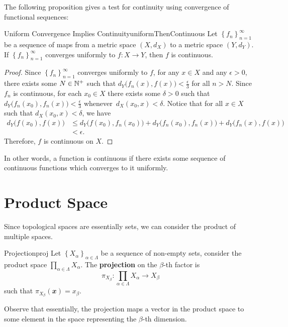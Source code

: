 \documentclass[math]{amznotes}
\theoremstyle{remark}
\begin{document}
The following proposition gives a test for continuity using convergence of functional sequences:
\begin{probox}{Uniform Convergence Implies Continuity}{uniformThenContinuous}
    Let $\left\{f_n\right\}_{n = 1}^{\infty}$ be a sequence of maps from a metric space $\left(X, d_X\right)$ to a metric space $\left(Y, d_Y\right)$. If $\left\{f_n\right\}_{n = 1}^{\infty}$ converges uniformly to $f \colon X \to Y$, then $f$ is continuous.
    \tcblower
    \begin{proof}
        Since $\left\{f_n\right\}_{n = 1}^{\infty}$ converges uniformly to $f$, for any $x \in X$ and any $\epsilon > 0$, there exists some $N \in \mathbb{N}^+$ such that $d_Y\bigl(f_n\left(x\right), f\left(x\right)\bigr) < \frac{\epsilon}{3}$ for all $n > N$. Since $f_n$ is continuous, for each $x_0 \in X$ there exists some $\delta > 0$ such that $d_Y\bigl(f_n\left(x_0\right), f_n\left(x\right)\bigr) < \frac{\epsilon}{3}$ whenever~$d_X\left(x_0, x\right) < \delta$. Notice that for all $x \in X$ such that $d_X\left(x_0, x\right) < \delta$, we have 
        \begin{align*}
            d_Y\bigl(f\left(x_0\right), f\left(x\right)\bigr) & \leq d_Y\bigl(f\left(x_0\right), f_n\left(x_0\right)\bigr)  + d_Y\bigl(f_n\left(x_0\right), f_n\left(x\right)\bigr) + d_Y\bigl(f_n\left(x\right), f\left(x\right)\bigr) \\
            & < \epsilon.
        \end{align*}
        Therefore, $f$ is continuous on $X$.
    \end{proof}
\end{probox}
In other words, a function is continuous if there exists some sequence of continuous functions which converges to it uniformly.
\section{Product Space}
Since topological spaces are essentially sets, we can consider the product of multiple spaces.
\begin{dfnbox}{Projection}{proj}
    Let $\left\{X_{\alpha}\right\}_{\alpha \in \Lambda}$ be a sequence of non-empty sets, consider the product space $\prod_{\alpha \in \Lambda}X_{\alpha}$. The {\color{red} \textbf{projection}} on the $\beta$-th factor is 
    \begin{equation*}
        \pi_{X_{\beta}} \colon \prod_{\alpha \in \Lambda}X_{\alpha} \to X_{\beta}
    \end{equation*}
    such that $\pi_{X_{\beta}}\left(\mathbfit{x}\right) = x_{\beta}$.
\end{dfnbox}
Observe that essentially, the projection maps a vector in the product space to some element in the space representing the $\beta$-th dimension.
\end{document}
